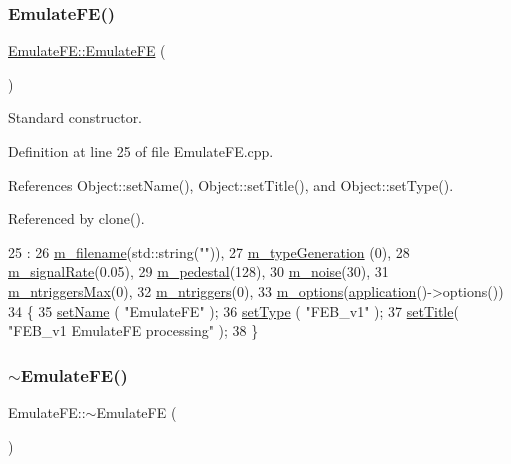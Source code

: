 \subsubsection{\texorpdfstring{Emulate\+F\+E()}{EmulateFE()}}
{\footnotesize\ttfamily \hyperlink{classEmulateFE_1_1EmulateFE}{Emulate\+F\+E\+::\+Emulate\+FE} (\begin{DoxyParamCaption}{ }\end{DoxyParamCaption})}



Standard constructor. 



Definition at line 25 of file Emulate\+F\+E.\+cpp.



References Object\+::set\+Name(), Object\+::set\+Title(), and Object\+::set\+Type().



Referenced by clone().


\begin{DoxyCode}
25                        :
26   \hyperlink{classEmulateFE_a103fedea9eb5d3963573f9120cb81a68}{m\_filename}(std::string(\textcolor{stringliteral}{""})),
27   \hyperlink{classEmulateFE_aa8bd0aa42cc5f3d52930408807b3067c}{m\_typeGeneration} (0),
28   \hyperlink{classEmulateFE_a7aeff9e62f850ca6d7ee27dce02a060b}{m\_signalRate}(0.05),
29   \hyperlink{classEmulateFE_a033996ce759c11305395ac865a6c074a}{m\_pedestal}(128),
30   \hyperlink{classEmulateFE_a74f8720a1da5806fad3811339ef9b98f}{m\_noise}(30),
31   \hyperlink{classEmulateFE_a2d473d12faf30f4870458874d70c7f55}{m\_ntriggersMax}(0),
32   \hyperlink{classEmulateFE_a8df57e3d66bde60e9a79cb2ae54a9f4a}{m\_ntriggers}(0),
33   \hyperlink{classEmulateFE_a2f2da7d4b2164c47673a6ecc6dcef1ea}{m\_options}(\hyperlink{Tools_8h_a27885a3c35afe79029fb830f32f66458}{application}()->options())
34 \{
35   \hyperlink{classObject_ae30fea75683c2d149b6b6d17c09ecd0c}{setName} ( \textcolor{stringliteral}{"EmulateFE"} );
36   \hyperlink{classObject_aae534cc9d982bcb9b99fd505f2e103a5}{setType} ( \textcolor{stringliteral}{"FEB\_v1"} );
37   \hyperlink{classObject_a89557dbbad5bcaa02652f5d7fa35d20f}{setTitle}( \textcolor{stringliteral}{"FEB\_v1 EmulateFE processing"} );
38 \}
\end{DoxyCode}
\mbox{\label{classEmulateFE_ab0ae9c65e546ec89bb0d6d318428d578}} 
\subsubsection{\texorpdfstring{$\sim$\+Emulate\+F\+E()}{~EmulateFE()}}
{\footnotesize\ttfamily Emulate\+F\+E\+::$\sim$\+Emulate\+FE (\begin{DoxyParamCaption}{ }\end{DoxyParamCaption})\hspace{0.3cm}{\ttfamily [virtual]}}



